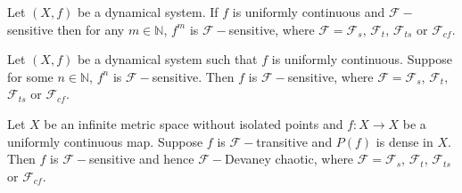 \documentclass[10pt,a4paper]{amsart}
\def\F{{\mathscr{F}}}
\def\N{{\mathbb N}}
\begin{document}
\begin{lemma} \label{T6}
	Let $(X,f)$ be a dynamical system. If $f$ is uniformly continuous and $\F-$sensitive then for any $m\in \N$, $f^m$ is $\F-$sensitive, where $\F=\F_s$, $\F_t$, $\F_{ts}$ or $\F_{cf}$.
\end{lemma}

\begin{lemma}\label{fnf}
	Let $(X,f)$ be a dynamical system such that $f$ is uniformly continuous. Suppose for some $n\in \N$, $f^n$ is $\F-$sensitive. Then $f$ is $\F-$sensitive, where $\F=\F_s$, $\F_t$, $\F_{ts}$ or $\F_{cf}$.
\end{lemma}

\begin{theorem} \label{T35}
	Let  $X$ be an infinite metric space without isolated points and $f: X \longrightarrow X$ be a uniformly continuous map. Suppose $f$ is $\F-$transitive and $P(f)$ is dense in $X$.  Then $f$ is $\F-$sensitive and hence $\F-$Devaney chaotic, where $\F=\F_{s}$, $\F_t$, $\F_{ts}$ or $\F_{cf}$. 
\end{theorem}	
\end{document}
